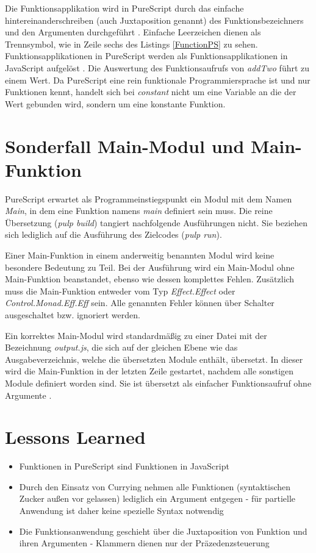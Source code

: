 \documentclass[
12pt,
ngerman,
oneside]
{scrbook} %
\begin{document}
Die Funktionsapplikation wird in PureScript durch das einfache hintereinanderschreiben (auch Juxtaposition genannt) des Funktionsbezeichners und den Argumenten durchgeführt \cite{PSSyntax18}. Einfache Leerzeichen dienen als Trennsymbol, wie in Zeile sechs des Listings \ref{FunctionPS} zu sehen. Funktionsapplikationen in PureScript werden als Funktionsapplikationen in JavaScript aufgelöst \cite[][S. 10]{Freeman17}. Die Auswertung des Funktionsaufrufs von \emph{addTwo} führt zu einem Wert. Da PureScript eine rein funktionale Programmiersprache ist und nur Funktionen kennt, handelt sich bei \emph{constant} nicht um eine Variable an die der Wert gebunden wird, sondern um eine konstante Funktion.

\section{Sonderfall Main-Modul und Main-Funktion}
PureScript erwartet als Programmeinstiegspunkt ein Modul mit dem Namen \emph{Main}, in dem eine Funktion namens \emph{main} definiert sein muss. Die reine Übersetzung (\emph{pulp build}) tangiert nachfolgende Ausführungen nicht. Sie beziehen sich lediglich auf die Ausführung des Zielcodes (\emph{pulp run}).

Einer Main-Funktion in einem anderweitig benannten Modul wird keine besondere Bedeutung zu Teil. Bei der Ausführung wird ein Main-Modul ohne Main-Funktion beanstandet, ebenso wie dessen komplettes Fehlen. Zusätzlich muss die Main-Funktion entweder vom Typ \emph{Effect.Effect} oder \emph{Control.Monad.Eff.Eff} sein. Alle genannten Fehler können über Schalter ausgeschaltet bzw. ignoriert werden. 

Ein korrektes Main-Modul wird standardmäßig zu einer Datei mit der Bezeichnung \emph{output.js}, die sich auf der gleichen Ebene wie das Ausgabeverzeichnis, welche die übersetzten Module enthält, übersetzt. In dieser wird die Main-Funktion in der letzten Zeile gestartet, nachdem alle sonstigen Module definiert worden sind. Sie ist übersetzt als einfacher Funktionsaufruf ohne Argumente \cite[][S. 10]{Freeman17}.

\section{Lessons Learned}
\begin{itemize}
	\item Funktionen in PureScript sind Funktionen in JavaScript
	\item Durch den Einsatz von Currying nehmen alle Funktionen (syntaktischen Zucker außen vor gelassen) lediglich ein Argument entgegen - für partielle Anwendung ist daher keine spezielle Syntax notwendig
	\item Die Funktionsanwendung geschieht über die Juxtaposition von Funktion und ihren Argumenten - Klammern dienen nur der Präzedenzsteuerung
\end{itemize}
\end{document}
